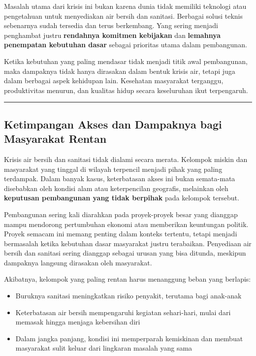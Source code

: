 \documentclass[
  letterpaper,
  DIV=11,
  numbers=noendperiod]{scrreprt}
\providecommand{\tightlist}{%
  \setlength{\itemsep}{0pt}\setlength{\parskip}{0pt}}
\begin{document}
Masalah utama dari krisis ini bukan karena dunia tidak memiliki
teknologi atau pengetahuan untuk menyediakan air bersih dan sanitasi.
Berbagai solusi teknis sebenarnya sudah tersedia dan terus berkembang.
Yang sering menjadi penghambat justru \textbf{rendahnya komitmen
kebijakan} dan \textbf{lemahnya penempatan kebutuhan dasar} sebagai
prioritas utama dalam pembangunan.

Ketika kebutuhan yang paling mendasar tidak menjadi titik awal
pembangunan, maka dampaknya tidak hanya dirasakan dalam bentuk krisis
air, tetapi juga dalam berbagai aspek kehidupan lain. Kesehatan
masyarakat terganggu, produktivitas menurun, dan kualitas hidup secara
keseluruhan ikut terpengaruh.

\begin{center}\rule{0.5\linewidth}{0.5pt}\end{center}

\subsection{Ketimpangan Akses dan Dampaknya bagi Masyarakat
Rentan}\label{ketimpangan-akses-dan-dampaknya-bagi-masyarakat-rentan}

Krisis air bersih dan sanitasi tidak dialami secara merata. Kelompok
miskin dan masyarakat yang tinggal di wilayah terpencil menjadi pihak
yang paling terdampak. Dalam banyak kasus, keterbatasan akses ini bukan
semata-mata disebabkan oleh kondisi alam atau keterpencilan geografis,
melainkan oleh \textbf{keputusan pembangunan yang tidak berpihak} pada
kelompok tersebut.

Pembangunan sering kali diarahkan pada proyek-proyek besar yang dianggap
mampu mendorong pertumbuhan ekonomi atau memberikan keuntungan politik.
Proyek semacam ini memang penting dalam konteks tertentu, tetapi menjadi
bermasalah ketika kebutuhan dasar masyarakat justru terabaikan.
Penyediaan air bersih dan sanitasi sering dianggap sebagai urusan yang
bisa ditunda, meskipun dampaknya langsung dirasakan oleh masyarakat.

Akibatnya, kelompok yang paling rentan harus menanggung beban yang
berlapis:

\begin{itemize}
\tightlist
\item
  Buruknya sanitasi meningkatkan risiko penyakit, terutama bagi
  anak-anak
\item
  Keterbatasan air bersih mempengaruhi kegiatan sehari-hari, mulai dari
  memasak hingga menjaga kebersihan diri
\item
  Dalam jangka panjang, kondisi ini memperparah kemiskinan dan membuat
  masyarakat sulit keluar dari lingkaran masalah yang sama
\end{itemize}
\end{document}
